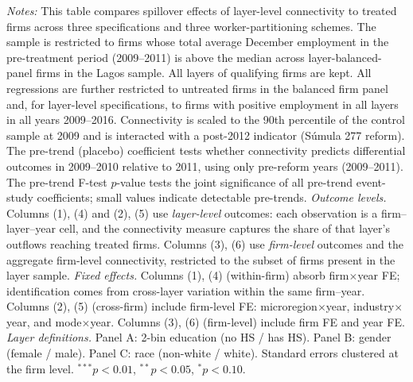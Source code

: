 \begin{table}[H]
\begin{threeparttable}
\begin{tablenotes}[flushleft]
\item \textit{Notes:} This table compares spillover effects of layer-level connectivity to treated firms across three specifications and three worker-partitioning schemes. The sample is restricted to firms whose total average December employment in the pre-treatment period (2009--2011) is above the median across layer-balanced-panel firms in the Lagos sample. All layers of qualifying firms are kept. All regressions are further restricted to untreated firms in the balanced firm panel and, for layer-level specifications, to firms with positive employment in all layers in all years 2009--2016. Connectivity is scaled to the 90th percentile of the control sample at 2009 and is interacted with a post-2012 indicator (S\'{u}mula 277 reform). The pre-trend (placebo) coefficient tests whether connectivity predicts differential outcomes in 2009--2010 relative to 2011, using only pre-reform years (2009--2011). The pre-trend F-test $p$-value tests the joint significance of all pre-trend event-study coefficients; small values indicate detectable pre-trends. \textit{Outcome levels.} Columns (1), (4) and (2), (5) use \textit{layer-level} outcomes: each observation is a firm--layer--year cell, and the connectivity measure captures the share of that layer's outflows reaching treated firms. Columns (3), (6) use \textit{firm-level} outcomes and the aggregate firm-level connectivity, restricted to the subset of firms present in the layer sample. \textit{Fixed effects.} Columns (1), (4) (within-firm) absorb firm$\times$year FE; identification comes from cross-layer variation within the same firm--year. Columns (2), (5) (cross-firm) include firm-level FE: microregion$\times$year, industry$\times$year, and mode$\times$year. Columns (3), (6) (firm-level) include firm FE and year FE. \textit{Layer definitions.} Panel A: 2-bin education (no HS / has HS). Panel B: gender (female / male). Panel C: race (non-white / white). Standard errors clustered at the firm level. $^{***}p<0.01$, $^{**}p<0.05$, $^{*}p<0.10$.
\end{tablenotes}
\end{threeparttable}
\end{table}